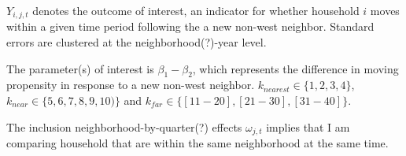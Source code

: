 \documentclass[../main.tex]{subfiles}
\begin{document}
$Y_{i, j, t}$ denotes the outcome of interest, an indicator for whether household $i$ moves within a given time period following the a new non-west neighbor. Standard errors are clustered at the neighborhood(?)-year level.

The parameter(s) of interest is $\beta_1 - \beta_2$, which represents the difference in moving propensity in response to a new non-west neighbor. $k_{nearest} \in \{1, 2, 3, 4\}$, $k_{near} \in \{5, 6, 7, 8, 9, 10)\}$ and $k_{far} \in \{[11-20], [21-30], [31-40]\}$.

The inclusion neighborhood-by-quarter(?) effects $\omega_{j,t}$ implies that I am comparing household that are within the same neighborhood at the same time. 
\end{document}
